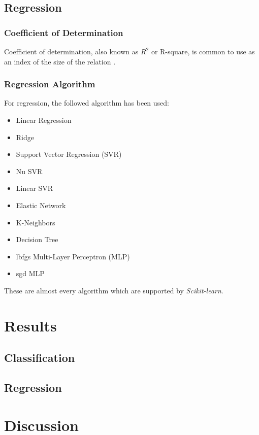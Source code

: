 \documentclass[aps, 11pt, a4paper]{article}
\begin{document}
		\subsection{Regression}
			\subsubsection{Coefficient of Determination}
				Coefficient of determination, also known as $R^2$ or R-square, is common to use as an index of the size of the relation \cite{ref:rsquare1}. 
				
			\subsubsection{Regression Algorithm}
				For regression, the followed algorithm has been used:
				\begin{itemize}
					\item Linear Regression
					\item Ridge
					\item Support Vector Regression (SVR)
					\item Nu SVR
					\item Linear SVR
					\item Elastic Network
					\item K-Neighbors
					\item Decision Tree
					\item lbfgs Multi-Layer Perceptron (MLP)
					\item sgd MLP
				\end{itemize}
				These are almost every algorithm which are supported by \textit{Scikit-learn}.
    
    \section{Results}
    	\subsection{Classification}
    	
    	\subsection{Regression}
    
    \section{Discussion}
    
\end{document}
